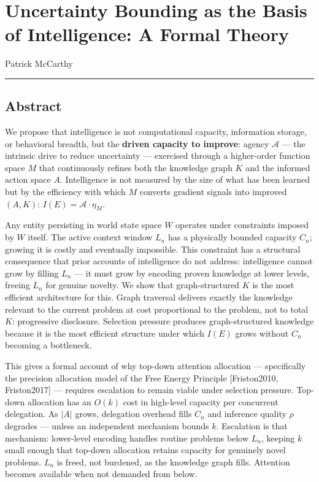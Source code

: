 \documentclass[
]{article}
\author{}
\date{}
\begin{document}
\section{Uncertainty Bounding as the Basis of Intelligence: A Formal
Theory}\label{uncertainty-bounding-as-the-basis-of-intelligence-a-formal-theory}

Patrick McCarthy

\begin{center}\rule{0.5\linewidth}{0.5pt}\end{center}

\subsection{Abstract}\label{abstract}

We propose that intelligence is not computational capacity, information
storage, or behavioral breadth, but the \textbf{driven capacity to
improve}: agency \(\mathcal{A}\) --- the intrinsic drive to reduce
uncertainty --- exercised through a higher-order function space \(M\)
that continuously refines both the knowledge graph \(K\) and the
informed action space \(A\). Intelligence is not measured by the size of
what has been learned but by the efficiency with which \(M\) converts
gradient signals into improved \((A, K)\):
\(I(E) = \mathcal{A} \cdot \eta_M\).

Any entity persisting in world state space \(W\) operates under
constraints imposed by \(W\) itself. The active context window \(L_n\)
has a physically bounded capacity \(C_n\); growing it is costly and
eventually impossible. This constraint has a structural consequence that
prior accounts of intelligence do not address: intelligence cannot grow
by filling \(L_n\) --- it must grow by encoding proven knowledge at
lower levels, freeing \(L_n\) for genuine novelty. We show that
graph-structured \(K\) is the most efficient architecture for this.
Graph traversal delivers exactly the knowledge relevant to the current
problem at cost proportional to the problem, not to total \(K\):
progressive disclosure. Selection pressure produces graph-structured
knowledge because it is the most efficient structure under which
\(I(E)\) grows without \(C_n\) becoming a bottleneck.

This gives a formal account of why top-down attention allocation ---
specifically the precision allocation model of the Free Energy Principle
{[}Friston2010, Friston2017{]} --- requires escalation to remain viable
under selection pressure. Top-down allocation has an \(O(k)\) cost in
high-level capacity per concurrent delegation. As \(|A|\) grows,
delegation overhead fills \(C_n\) and inference quality \(\rho\)
degrades --- unless an independent mechanism bounds \(k\). Escalation is
that mechanism: lower-level encoding handles routine problems below
\(L_n\), keeping \(k\) small enough that top-down allocation retains
capacity for genuinely novel problems. \(L_n\) is freed, not burdened,
as the knowledge graph fills. Attention becomes available when not
demanded from below.
\end{document}
